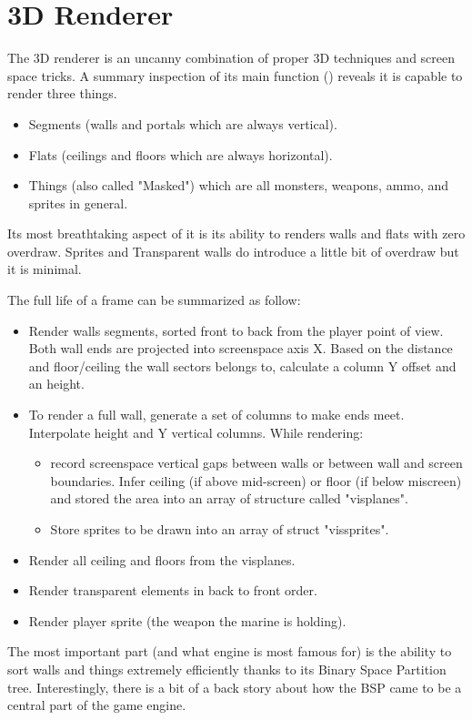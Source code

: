 \section{3D Renderer}
The 3D renderer is an uncanny combination of proper 3D techniques and screen space tricks. A summary inspection of its main function () reveals it is capable to render three things.\\
\par
{}
\par
\begin{itemize}
	\item Segments (walls and portals which are always vertical).
	\item Flats (ceilings and floors which are always horizontal).
	\item Things (also called "Masked") which are all monsters, weapons, ammo, and sprites in general.
\end{itemize}
 Its most breathtaking aspect of it is its ability to renders walls and flats with zero overdraw. Sprites and Transparent walls do introduce a little bit of overdraw but it is minimal.\\
\par
The full life of a frame can be summarized as follow:
\begin{itemize}
\item Render walls segments, sorted front to back from the player point of view. Both wall ends are projected into screenspace axis X. Based on the distance and floor/ceiling the wall sectors belongs to, calculate a column Y offset and an height. 
\item To render a full wall, generate a set of columns to make ends meet. Interpolate height and Y vertical columns. While rendering:
   \begin{itemize}
     \item record screenspace vertical gaps between walls or between wall and screen boundaries. Infer ceiling (if above mid-screen) or floor (if below miscreen) and stored the area into an array of structure called "visplanes".
     \item Store sprites to be drawn into an array of struct "vissprites".
   \end{itemize}      
\item Render all ceiling and floors from the visplanes.
\item Render transparent elements in back to front order.
\item Render player sprite (the weapon the marine is holding).
\end{itemize}
\par
The most important part (and what \doom engine is most famous for) is the ability to sort walls and things extremely efficiently thanks to its Binary Space Partition tree. Interestingly, there is a bit of a back story about how the BSP came to be a central part of the game engine.\\
\par
\pagebreak

